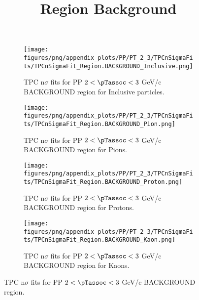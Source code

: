             \begin{figure}[H]
                \title{Region Background}
                \begin{subfigure}[b]{0.5\textwidth}
                    \centering
                    \texttt{[image: figures/png/appendix\_plots/PP/PT\_2\_3/TPCnSigmaFits/TPCnSigmaFit\_Region.BACKGROUND\_Inclusive.png]}
                    \caption{TPC n$\sigma$ fits for PP $2 < \pTassoc < 3$ GeV/c BACKGROUND region for Inclusive particles.}
                    \label{fig:appendix_PP_$2 < \pTassoc < 3$ GeV/c_BACKGROUND_Inclusive}
                \end{subfigure}
                \begin{subfigure}[b]{0.5\textwidth}
                    \centering
                    \texttt{[image: figures/png/appendix\_plots/PP/PT\_2\_3/TPCnSigmaFits/TPCnSigmaFit\_Region.BACKGROUND\_Pion.png]}
                    \caption{TPC n$\sigma$ fits for PP $2 < \pTassoc < 3$ GeV/c BACKGROUND region for Pions.}
                    \label{fig:appendix_PP_$2 < \pTassoc < 3$ GeV/c_BACKGROUND_Pion}
                \end{subfigure}
                \begin{subfigure}[b]{0.5\textwidth}
                    \centering
                    \texttt{[image: figures/png/appendix\_plots/PP/PT\_2\_3/TPCnSigmaFits/TPCnSigmaFit\_Region.BACKGROUND\_Proton.png]}
                    \caption{TPC n$\sigma$ fits for PP $2 < \pTassoc < 3$ GeV/c BACKGROUND region for Protons.}
                    \label{fig:appendix_PP_$2 < \pTassoc < 3$ GeV/c_BACKGROUND_Proton}
                \end{subfigure}
                \begin{subfigure}[b]{0.5\textwidth}
                    \centering
                    \texttt{[image: figures/png/appendix\_plots/PP/PT\_2\_3/TPCnSigmaFits/TPCnSigmaFit\_Region.BACKGROUND\_Kaon.png]}
                    \caption{TPC n$\sigma$ fits for PP $2 < \pTassoc < 3$ GeV/c BACKGROUND region for Kaons.}
                    \label{fig:appendix_PP_$2 < \pTassoc < 3$ GeV/c_BACKGROUND_Kaon}
                \end{subfigure}
                \caption{TPC n$\sigma$ fits for PP $2 < \pTassoc < 3$ GeV/c BACKGROUND region.}
                \label{fig:appendix_PP_$2 < \pTassoc < 3$ GeV/c_BACKGROUND}
            \end{figure}
            \clearpage
            
